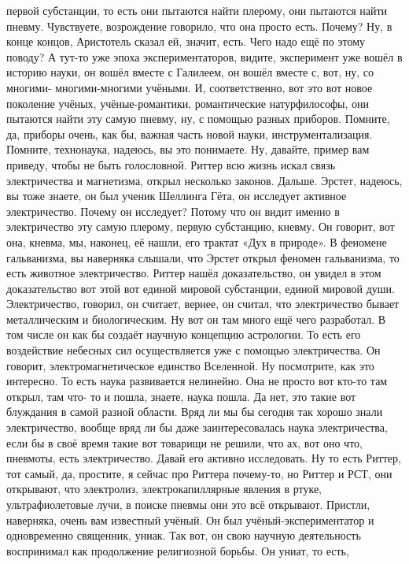 первой субстанции, то есть они пытаются найти плерому, они пытаются найти
пневму. Чувствуете, возрождение говорило, что она просто есть. Почему? Ну, в
конце концов, Аристотель сказал ей, значит, есть. Чего надо ещё по этому поводу?
А тут-то уже эпоха экспериментаторов, видите, эксперимент уже вошёл в историю
науки, он вошёл вместе с Галилеем, он вошёл вместе с, вот, ну, со многими-
многими-многими учёными. И, соответственно, вот это вот новое поколение учёных,
учёные-романтики, романтические натурфилософы, они пытаются найти эту самую
пневму, ну, с помощью разных приборов. Помните, да, приборы очень, как бы,
важная часть новой науки, инструментализация. Помните, технонаука, надеюсь, вы
это понимаете. Ну, давайте, пример вам приведу, чтобы не быть голословной.
Риттер всю жизнь искал связь электричества и магнетизма, открыл несколько
законов. Дальше. Эрстет, надеюсь, вы тоже знаете, он был ученик Шеллинга Гёта,
он исследует активное электричество. Почему он исследует? Потому что он видит
именно в электричество эту самую плерому, первую субстанцию, кневму. Он говорит,
вот она, кневма, мы, наконец, её нашли, его трактат «Дух в природе». В феномене
гальванизма, вы наверняка слышали, что Эрстет открыл феномен гальванизма, то
есть животное электричество. Риттер нашёл доказательство, он увидел в этом
доказательство вот этой вот единой мировой субстанции, единой мировой души.
Электричество, говорил, он считает, вернее, он считал, что электричество бывает
металлическим и биологическим. Ну вот он там много ещё чего разработал. В том
числе он как бы создаёт научную концепцию астрологии. То есть его воздействие
небесных сил осуществляется уже с помощью электричества. Он говорит,
электромагнетическое единство Вселенной. Ну посмотрите, как это интересно. То
есть наука развивается нелинейно. Она не просто вот кто-то там открыл, там что-
то и пошла, знаете, наука пошла. Да нет, это такие вот блуждания в самой разной
области. Вряд ли мы бы сегодня так хорошо знали электричество, вообще вряд ли бы
даже заинтересовалась наука электричества, если бы в своё время такие вот
товарищи не решили, что ах, вот оно что, пневмоты, есть электричество. Давай его
активно исследовать. Ну то есть Риттер, тот самый, да, простите, я сейчас про
Риттера почему-то, но Риттер и РСТ, они открывают, что электролиз,
электрокапиллярные явления в ртуке, ультрафиолетовые лучи, в поиске пневмы они
это всё открывают. Пристли, наверняка, очень вам известный учёный. Он был
учёный-экспериментатор и одновременно священник, униак. Так вот, он свою научную
деятельность воспринимал как продолжение религиозной борьбы. Он униат, то есть,
